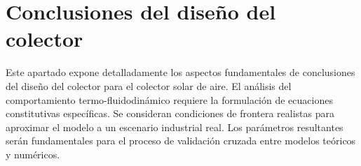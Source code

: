 \section{Conclusiones del diseño del colector}
\label{sec:cap10_conclusiones_diseno}

Este apartado expone detalladamente los aspectos fundamentales de conclusiones del diseño del colector para el colector solar de aire.
El análisis del comportamiento termo-fluidodinámico requiere la formulación de ecuaciones constitutivas específicas.
Se consideran condiciones de frontera realistas para aproximar el modelo a un escenario industrial real.
Los parámetros resultantes serán fundamentales para el proceso de validación cruzada entre modelos teóricos y numéricos.
